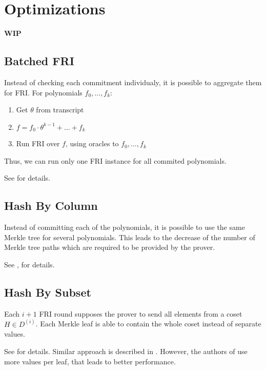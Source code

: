 \section{Optimizations}
\label{section:optimizations}
\textbf{WIP}

\subsection{Batched FRI}

Instead of checking each commitment individualy, it is possible to aggregate them 
for FRI.
For polynomials $f_0, \dots, f_k$:
\begin{enumerate}
    \item Get $\theta$ from transcript
    \item $f = f_0 \cdot \theta^{k - 1} + \dots + f_k$
    \item Run FRI over $f$, using oracles to $f_0, \dots, f_k$
\end{enumerate}

Thus, we can run only one FRI instance for all commited polynomials.

See \cite{cryptoeprint:2019:1400} for details.

\subsection{Hash By Column}

Instead of committing each of the polynomials, it is possible to use the same Merkle 
tree for several polynomials.
This leads to the decrease of the number of Merkle tree paths which are required
to be provided by the prover.

See \cite{cryptoeprint:2019:1076}, \cite{cryptoeprint:2019:1400} for details.

\subsection{Hash By Subset}

Each $i + 1$ FRI round supposes the prover to send all elements from a coset $H \in D^{(i)}$.
Each Merkle leaf is able to contain the whole coset instead of separate values.

See \cite{cryptoeprint:2019:1076} for details.
Similar approach is described in \cite{cryptoeprint:2019:1400}.
However, the authors of \cite{cryptoeprint:2019:1400} use more values per leaf, that leads to better performance. 
